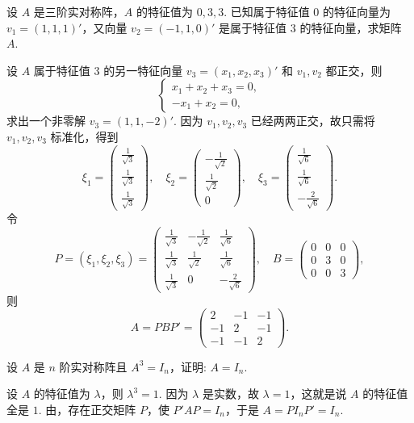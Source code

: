 \documentclass[../../main.tex]{subfiles}
\begin{document}
\begin{example}
设 $A$ 是三阶实对称阵，$A$ 的特征值为 $0,3,3$. 已知属于特征值 $0$ 的特征向量为 $v_1 = (1,1,1)'$，又向量 $v_2 = (-1,1,0)'$ 是属于特征值 $3$ 的特征向量，求矩阵 $A$.
\end{example}
\begin{solution}
设 $A$ 属于特征值 $3$ 的另一特征向量 $v_3 = (x_1,x_2,x_3)'$ 和 $v_1,v_2$ 都正交，则
\[
\begin{cases}
x_1 + x_2 + x_3 = 0, \\
-x_1 + x_2 = 0,
\end{cases}
\]
求出一个非零解 $v_3 = (1,1,-2)'$. 因为 $v_1,v_2,v_3$ 已经两两正交，故只需将 $v_1,v_2,v_3$ 标准化，得到
\[
\xi_1 = 
\begin{pmatrix}
\frac{1}{\sqrt{3}} \\
\frac{1}{\sqrt{3}} \\
\frac{1}{\sqrt{3}}
\end{pmatrix}, \quad 
\xi_2 = 
\begin{pmatrix}
-\frac{1}{\sqrt{2}} \\
\frac{1}{\sqrt{2}} \\
0
\end{pmatrix}, \quad 
\xi_3 = 
\begin{pmatrix}
\frac{1}{\sqrt{6}} \\
\frac{1}{\sqrt{6}} \\
-\frac{2}{\sqrt{6}}
\end{pmatrix}.
\]
令
\[
P = (\xi_1,\xi_2,\xi_3) = 
\begin{pmatrix}
\frac{1}{\sqrt{3}} & -\frac{1}{\sqrt{2}} & \frac{1}{\sqrt{6}} \\
\frac{1}{\sqrt{3}} & \frac{1}{\sqrt{2}} & \frac{1}{\sqrt{6}} \\
\frac{1}{\sqrt{3}} & 0 & -\frac{2}{\sqrt{6}}
\end{pmatrix}, \quad 
B = 
\begin{pmatrix}
0 & 0 & 0 \\
0 & 3 & 0 \\
0 & 0 & 3
\end{pmatrix},
\]
则
\[
A = PBP' = 
\begin{pmatrix}
2 & -1 & -1 \\
-1 & 2 & -1 \\
-1 & -1 & 2
\end{pmatrix}.
\]
\end{solution}

\begin{example}
设 $A$ 是 $n$ 阶实对称阵且 $A^3 = I_n$，证明: $A = I_n$.
\end{example}
\begin{solution}
设 $A$ 的特征值为 $\lambda$，则 $\lambda^3 = 1$. 因为 $\lambda$ 是实数，故 $\lambda = 1$，这就是说 $A$ 的特征值全是 $1$. 由，存在正交矩阵 $P$，使 $P'AP = I_n$，于是 $A = PI_nP' = I_n$.
\end{solution}
\end{document}
